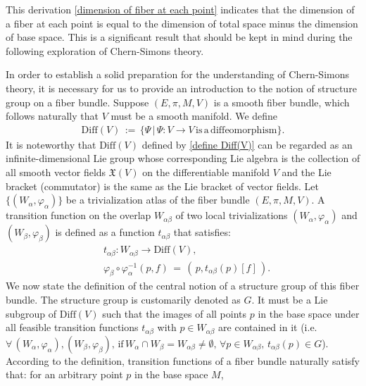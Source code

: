 This derivation \eqref{dimension of fiber at each point} indicates that the dimension of a fiber at each point is equal to the dimension of total space minus the dimension of base space. This is a significant result that should be kept in mind during the following exploration of Chern-Simons theory.
\par In order to establish a solid preparation for the understanding of Chern-Simons theory, it is necessary for us to provide an introduction to the notion of structure group on a fiber bundle. Suppose $\left(E,\pi,M,V\right)$ is a smooth fiber bundle, which follows naturally that $V$ must be a smooth manifold. We define
\begin{equation}\label{define Diff(V)}
    \begin{split}
        \mathrm{Diff}\left(V\right)\,:=\,\{\Psi\,|\,\Psi:V\rightarrow V \,\mathrm{is\,a\,diffeomorphism}\}.
    \end{split}
\end{equation}
It is noteworthy that $\mathrm{Diff}\left(V\right)$ defined by \eqref{define Diff(V)} can be regarded as an infinite-dimensional Lie group whose corresponding Lie algebra is the collection of all smooth vector fields $\mathfrak{X}\left(V\right)$ on the differentiable manifold $V$ and the Lie bracket (commutator) is the same as the Lie bracket of vector fields. Let $\{\left(W_{\alpha},\varphi_{\alpha}\right)\}$ be a trivialization atlas of the fiber bundle $\left(E,\pi,M,V\right)$. A transition function on the overlap $W_{\alpha\beta}$ of two local trivializations $\left(W_{\alpha},\varphi_{\alpha}\right)$ and $\left(W_{\beta},\varphi_{\beta}\right)$ is defined as a function $t_{\alpha\beta}$ that satisfies:
\begin{equation}\label{define transition functions}
    \begin{split}
        &t_{\alpha\beta}:W_{\alpha\beta}\rightarrow \mathrm{Diff}\left(V\right), \\
        &\varphi_{\beta}\circ\varphi_{\alpha}^{-1}\left(p,f\right)\,=\,\left(\,p,t_{\alpha\beta}\left(p\right)[f]\,\right).
    \end{split}
\end{equation}
We now state the definition of the central notion of a structure group of this fiber bundle. The structure group is customarily denoted as $G$. It must be a Lie subgroup of $\mathrm{Diff}\left(V\right)$ such that the images of all points $p$ in the base space under all feasible transition functions $t_{\alpha\beta}$ with $p\in W_{\alpha\beta}$ are contained in it (i.e. $\forall\,\left(W_{\alpha},\varphi_{\alpha}\right),\left(W_{\beta},\varphi_{\beta}\right),\,\mathrm{if}\,W_{\alpha}\cap W_{\beta}=W_{\alpha\beta}\neq\emptyset,\,\forall p\in W_{\alpha\beta},\,t_{\alpha\beta}\left(p\right)\in G$). According to the definition, transition functions of a fiber bundle naturally satisfy that: for an arbitrary point $p$ in the base space $M$,
